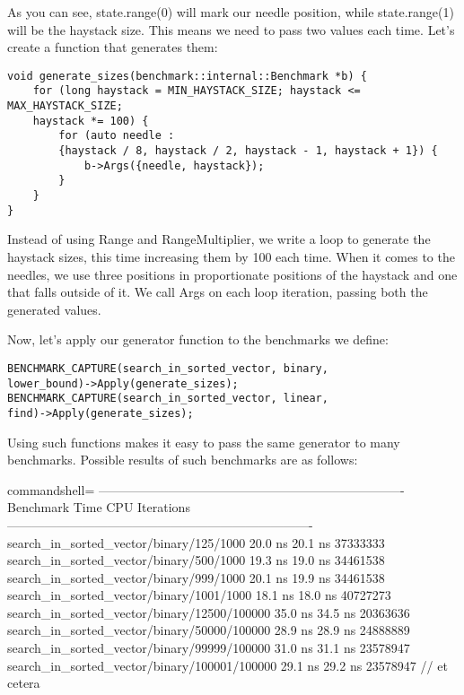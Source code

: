 As you can see, state.range(0) will mark our needle position, while state.range(1) will be the haystack size. This means we need to pass two values each time. Let's create a function that generates them:

\begin{lstlisting}[style=styleCXX]
void generate_sizes(benchmark::internal::Benchmark *b) {
	for (long haystack = MIN_HAYSTACK_SIZE; haystack <= MAX_HAYSTACK_SIZE;
	haystack *= 100) {
		for (auto needle :
		{haystack / 8, haystack / 2, haystack - 1, haystack + 1}) {
			b->Args({needle, haystack});
		}
	}
}
\end{lstlisting}

Instead of using Range and RangeMultiplier, we write a loop to generate the haystack sizes, this time increasing them by 100 each time. When it comes to the needles, we use three positions in proportionate positions of the haystack and one that falls outside of it. We call Args on each loop iteration, passing both the generated values.

Now, let's apply our generator function to the benchmarks we define:

\begin{lstlisting}[style=styleCXX]
BENCHMARK_CAPTURE(search_in_sorted_vector, binary,
lower_bound)->Apply(generate_sizes);
BENCHMARK_CAPTURE(search_in_sorted_vector, linear,
find)->Apply(generate_sizes);
\end{lstlisting}

Using such functions makes it easy to pass the same generator to many benchmarks. Possible results of such benchmarks are as follows:

\begin{tcblisting}{commandshell={}}
-------------------------------------------------------------------------
Benchmark Time CPU Iterations
-------------------------------------------------------------------------
search_in_sorted_vector/binary/125/1000 20.0 ns 20.1 ns 37333333
search_in_sorted_vector/binary/500/1000 19.3 ns 19.0 ns 34461538
search_in_sorted_vector/binary/999/1000 20.1 ns 19.9 ns 34461538
search_in_sorted_vector/binary/1001/1000 18.1 ns 18.0 ns 40727273
search_in_sorted_vector/binary/12500/100000 35.0 ns 34.5 ns 20363636
search_in_sorted_vector/binary/50000/100000 28.9 ns 28.9 ns 24888889
search_in_sorted_vector/binary/99999/100000 31.0 ns 31.1 ns 23578947
search_in_sorted_vector/binary/100001/100000 29.1 ns 29.2 ns 23578947
// et cetera
\end{tcblisting}

